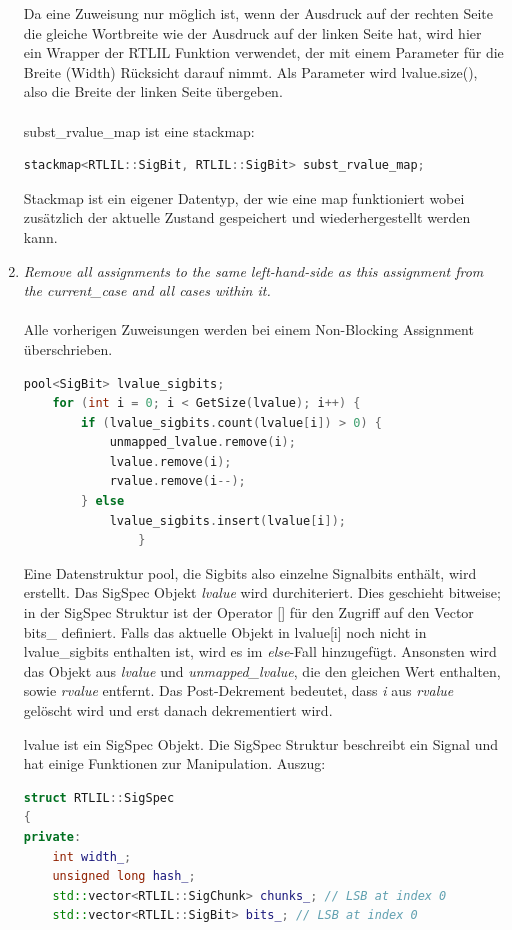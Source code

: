 \documentclass[11pt]{report}
\begin{document}
\begin{enumerate}
Da eine Zuweisung nur möglich ist, wenn der Ausdruck auf der rechten Seite die gleiche Wortbreite wie der Ausdruck auf der linken Seite hat, wird hier ein Wrapper der RTLIL Funktion verwendet, der mit einem Parameter für die Breite (Width) Rücksicht darauf nimmt. Als Parameter wird lvalue.size(), also die Breite der linken Seite übergeben.\\
\\
subst\_rvalue\_map ist eine stackmap:
\begin{lstlisting}[language=C++]
stackmap<RTLIL::SigBit, RTLIL::SigBit> subst_rvalue_map;
\end{lstlisting}

Stackmap ist ein eigener Datentyp, der wie eine map funktioniert wobei zusätzlich der aktuelle Zustand gespeichert und wiederhergestellt werden kann.

  
  \item \textit{Remove all assignments to the same left-hand-side as this assignment from the current\_case and all
cases within it.}
\\
\\
Alle vorherigen Zuweisungen werden bei einem Non-Blocking Assignment überschrieben.

\begin{lstlisting}[language=C++]
	pool<SigBit> lvalue_sigbits;
	for (int i = 0; i < GetSize(lvalue); i++) {
		if (lvalue_sigbits.count(lvalue[i]) > 0) {
			unmapped_lvalue.remove(i);
			lvalue.remove(i);
			rvalue.remove(i--);
		} else
			lvalue_sigbits.insert(lvalue[i]);
				}
\end{lstlisting}
Eine Datenstruktur pool, die Sigbits also einzelne Signalbits enthält, wird erstellt.
Das SigSpec Objekt \textit{lvalue} wird durchiteriert. Dies geschieht bitweise; in der SigSpec Struktur ist der Operator [] für den Zugriff auf den Vector bits\_ definiert.
Falls das aktuelle Objekt in lvalue[i] noch nicht in lvalue\_sigbits enthalten ist, wird es im \textit{else}-Fall hinzugefügt. Ansonsten wird das Objekt aus \textit{lvalue} und \textit{unmapped\_lvalue}, die den gleichen Wert enthalten, sowie \textit{rvalue} entfernt. Das Post-Dekrement bedeutet, dass \textit{i} aus \textit{rvalue} gelöscht wird und erst danach dekrementiert wird.



lvalue ist ein SigSpec Objekt.
Die SigSpec Struktur beschreibt ein Signal und hat einige Funktionen zur Manipulation.
Auszug:
\begin{lstlisting}[language=C++]
struct RTLIL::SigSpec
{
private:
	int width_;
	unsigned long hash_;
	std::vector<RTLIL::SigChunk> chunks_; // LSB at index 0
	std::vector<RTLIL::SigBit> bits_; // LSB at index 0
\end{lstlisting}


\end{enumerate}
\end{document}
